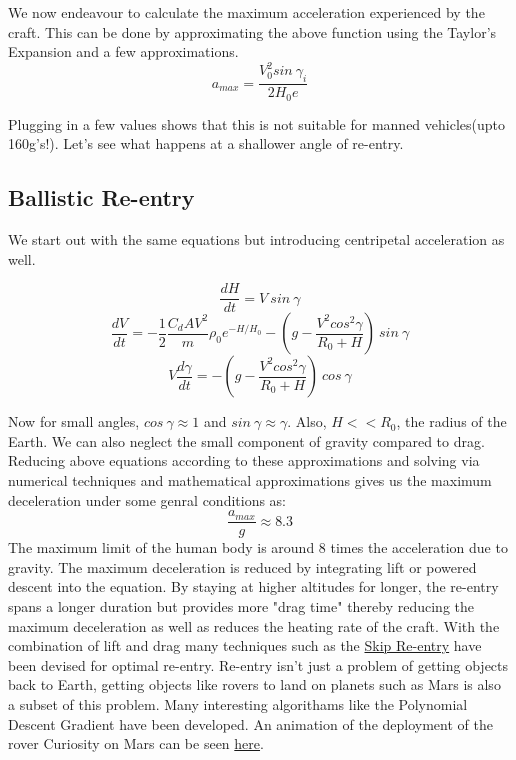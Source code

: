 \documentclass[12pt, letterpaper]{article}
\begin{document}
We now endeavour to calculate the maximum acceleration experienced by the craft. This can be done by approximating the above function using the Taylor's Expansion and a few approximations. 
\[
	a_{max} = \frac{V_0^2 sin\:\gamma_i}{2H_0e}
\]

Plugging in a few values shows that this is not suitable for manned vehicles(upto 160g's!). Let's see what happens at a shallower angle of re-entry.

\subsection{Ballistic Re-entry}
We start out with the same equations but introducing centripetal acceleration as well.

\[
	\frac{dH}{dt} = V \:sin\:\gamma
\]
\[
	\frac{dV}{dt} = - \frac{1}{2} \frac{C_d A V^2}{m} \rho_0 e ^ {-H/H_0} - \left( g -\frac{V^2cos^2\gamma}{R_0 + H} \right) \:sin\:\gamma
\]
\[
	V\frac{d\gamma}{dt} = -\left( g -\frac{V^2cos^2\gamma}{R_0 + H} \right)\:cos\:\gamma
\]

Now for small angles, $cos\:\gamma \approx 1$ and $sin\:\gamma \approx \gamma$. Also, $H<<R_0$, the radius of the Earth. We can also neglect the small component of gravity compared to drag. Reducing above equations according to these approximations and solving via numerical techniques and mathematical approximations gives us the maximum deceleration under some genral conditions as:
\[
	\frac{a_{max}}{g} \approx 8.3
\]
The maximum limit of the human body is around 8 times the acceleration due to gravity. The maximum deceleration is reduced by integrating lift or powered descent into the equation. By staying at higher altitudes for longer, the re-entry spans a longer duration but provides more "drag time" thereby reducing the maximum deceleration as well as reduces the heating rate of the craft. With the combination of lift and drag many techniques such as the \href{https://en.wikipedia.org/wiki/Boost-glide}{Skip Re-entry} have been devised for optimal re-entry. Re-entry isn't just a problem of getting objects back to Earth, getting objects like rovers to land on planets such as Mars is also a subset of this problem. Many interesting algorithams like the Polynomial Descent Gradient have been developed. An animation of the deployment of the rover Curiosity on Mars can be seen \href{https://www.youtube.com/watch?v=gwinFP8_qIM}{here}.
\end{document}
